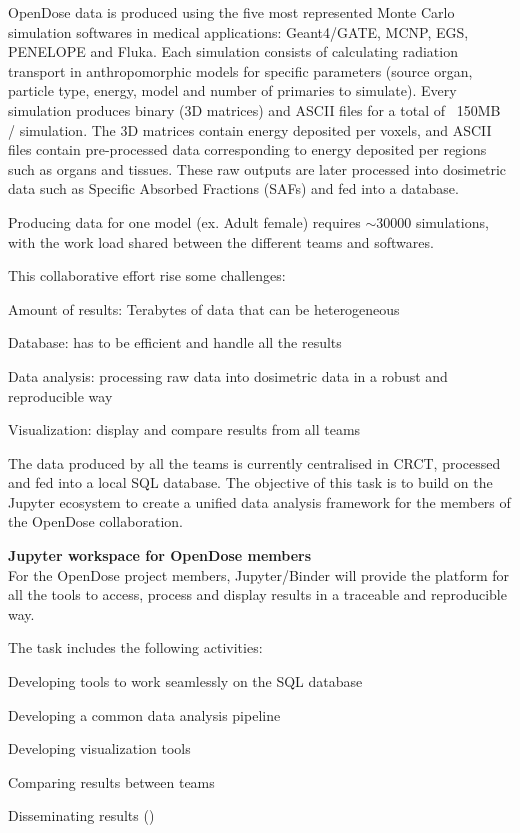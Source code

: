 \begin{task}[title=OpenDose unified data analysis framework,
  id=opendose-analysis,
  lead=INSERM,
  PM=24,
  wphases={0-48},
  partners={}
]
  OpenDose data is produced using the five most represented Monte Carlo
  simulation softwares in medical applications: Geant4/GATE, MCNP, EGS,
  PENELOPE and Fluka. Each simulation consists of calculating radiation
  transport in anthropomorphic models  for specific parameters (source organ,
  particle type, energy, model and number of primaries to simulate).  Every
  simulation produces binary (3D matrices) and ASCII files for a total of
  ~150MB / simulation. The 3D matrices contain energy deposited per voxels, and
  ASCII files contain pre-processed data corresponding to energy deposited per
  regions such as organs and tissues. These raw outputs are later processed
  into dosimetric data such as Specific Absorbed Fractions (SAFs) and fed into
  a database.

  Producing data for one model (ex. Adult female) requires $\sim 30 000$
  simulations, with the work load shared between the different teams and
  softwares. 

  This collaborative effort rise some challenges:
  \begin{compactitem}
  \item Amount of results: Terabytes of data that can be heterogeneous
  \item Database: has to be efficient and handle all the results 
  \item Data analysis: processing raw data into dosimetric data in a robust and
  reproducible way
  \item Visualization: display and compare results from all teams
  \end{compactitem}


  The data produced by all the teams is currently centralised in CRCT,
  processed and fed into a local SQL database. 
  The objective of this task is to build on the Jupyter ecosystem to create a
  unified data analysis framework for the members of the OpenDose
  collaboration.

  \textbf{Jupyter workspace for OpenDose members}\\
  For the OpenDose project members, Jupyter/Binder will provide the platform
  for all the tools to access, process and display results in a traceable and
  reproducible way.

  The task includes the following activities:
  \begin{compactitem}
  \item Developing tools to work seamlessly on the SQL database
  \item Developing a common data analysis pipeline
  \item Developing visualization tools
  \item Comparing results between teams
  \item Disseminating results
    ()
  \end{compactitem}


\end{task}
